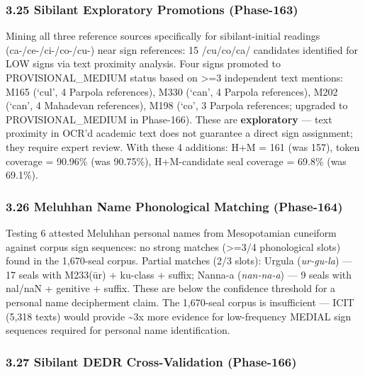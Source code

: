 \documentclass[
]{article}
\begin{document}
\subsubsection{3.25 Sibilant Exploratory Promotions
(Phase-163)}\label{sibilant-exploratory-promotions-phase-163}

Mining all three reference sources specifically for sibilant-initial
readings (ca-/ce-/ci-/co-/cu-) near sign references: 15 /cu/co/ca/
candidates identified for LOW signs via text proximity analysis. Four
signs promoted to PROVISIONAL\_MEDIUM status based on \textgreater{}=3 independent text
mentions: M165 (`cul', 4 Parpola references), M330 (`can', 4 Parpola
references), M202 (`can', 4 Mahadevan references), M198 (`co', 3 Parpola references;
upgraded to PROVISIONAL\_MEDIUM in Phase-166). These are \textbf{exploratory} --- text proximity
in OCR'd academic text does not guarantee a direct sign assignment; they
require expert review. With these 4 additions: H+M = 161 (was 157),
token coverage = 90.96\% (was 90.75\%), H+M-candidate seal coverage = 69.8\% (was 69.1\%).

\subsubsection{3.26 Meluhhan Name Phonological Matching
(Phase-164)}\label{meluhhan-name-phonological-matching-phase-164}

Testing 6 attested Meluhhan personal names from Mesopotamian cuneiform
against corpus sign sequences: no strong matches (\textgreater{}=3/4 phonological
slots) found in the 1,670-seal corpus. Partial matches (2/3 slots):
Urgula (\emph{ur-gu-la}) --- 17 seals with M233(ūr) + ku-class + suffix;
Nanna-a (\emph{nan-na-a}) --- 9 seals with nal/naN + genitive + suffix.
These are below the confidence threshold for a personal name
decipherment claim. The 1,670-seal corpus is insufficient --- ICIT
(5,318 texts) would provide \textasciitilde3x more evidence for
low-frequency MEDIAL sign sequences required for personal name
identification.

\subsubsection{3.27 Sibilant DEDR Cross-Validation
(Phase-166)}\label{sibilant-dedr-cross-validation-phase-166}
\end{document}
